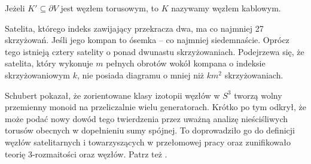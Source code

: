 \begin{definition}
	Jeżeli $K' \subseteq \partial V$ jest węzłem torusowym,	to $K$ nazywamy węzłem kablowym.
\end{definition}

Satelita, którego indeks zawijający przekracza dwa, ma co najmniej 27 skrzyżowań.
Jeśli jego kompan to ósemka -- co najmniej siedemnaście.
Oprócz tego istnieją cztery satelity o ponad dwunastu skrzyżowaniach.
Podejrzewa się, że satelita, który wykonuje $m$ pełnych obrotów wokół kompana o indeksie skrzyżowaniowym $k$, nie posiada diagramu o mniej niż $km^2$ skrzyżowaniach.

Schubert pokazał, że zorientowane klasy izotopii węzłów w $S^3$ tworzą wolny przemienny monoid na przeliczalnie wielu generatorach.
Krótko po tym odkrył, że może podać nowy dowód tego twierdzenia przez uważną analizę nieściśliwych torusów obecnych w dopełnieniu sumy spójnej.
To doprowadziło go do definicji węzłów satelitarnych i towarzyszących w przełomowej pracy \cite{schubert53} oraz zunifikowało teorię 3-rozmaitości oraz węzłów.
Patrz też \cite{motegi97}.

